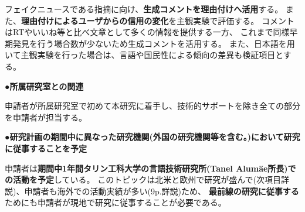 {	フェイクニュースである指摘に向け、\textbf{生成コメントを理由付けへ活用}する。
	また、\textbf{理由付けによるユーザからの信用の変化}を主観実験で評価する。
	コメントはRTやいいね等と比べ文章として多くの情報を提供する一方、
	これまで同様早期発見を行う場合数が少ないため生成コメントを活用する。
	また、⽇本語を⽤いて主観実験を⾏った場合は、⾔語や国⺠性による傾向の差異も検証項⽬とする。

	\noindent
	●\textbf{所属研究室との関連}

	申請者が所属研究室で初めて本研究に着手し、技術的サポートを除き全ての部分を申請者が担当する。

	\noindent
	●\textbf{研究計画の期間中に異なった研究機関(外国の研究機関等を含む。)において研究に従事することを予定}
	
	申請者は\textbf{期間中1年間タリン工科大学の言語技術研究所(Tanel Alumäe所長)での活動を予定}している。
	このトピックは北米と欧州で研究が盛んで(次項目詳説)、申請者も海外での活動実績が多い(9p.詳説)ため、
	\textbf{最前線の研究に従事する}ためにも申請者が現地で研究に従事することが必要である。

}

\newcommand{\人権の保護及び法令等の遵守への対応}{%
	コメント取得を予定してしているSNSはTwitterである。
	Twitter社は2020年3月より学術目的でTwitter APIの利用を自由化しているほか、
	取得したツイートIDを含む情報をデータセットとして公開することも学術目的であれば認められている\cite{twitter_2020}。

	また、先行研究が提供したデータセットを使用する場合は、提供者が示すライセンスやポリシーを遵守する。

	なお、学習済みモデルの公表は平成30年改正著作権法第30条4号により認められている。

	ただし、本研究では主観評価実験としてSNSユーザを対象としたアンケート調査を予定している。
	この調査により収集したデータは、個⼈の特定につながる情報を匿名化した上で解析を⾏い、
	解析結果の公表に際しては、匿名化を⾏ったデータを⽤い、個⼈情報の漏洩防⽌に配慮する。

	{\footnotesize
		\begin{thebibliography}{99}
			\setcounter{enumiv}{11}
			\bibitem{twitter_2020} Twitter開発者ポリシーを分かりやすくアップデート, 2020年3月11日. (最終閲覧日 2020年4月19日) \url{https://blog.twitter.com/developer/ja_jp/topics/tools/2020/DevPolicyUpdate.html}
		\end{thebibliography}
	}
}

